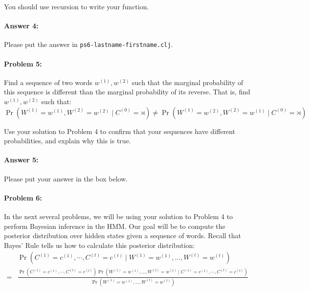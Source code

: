 \documentclass[10pt]{article}
\newenvironment{AnswerBox}{\begin{mdframed}[style=simple]}{\end{mdframed}}
\newcommand{\PSnum}{6}
\begin{document}
You should use recursion to write your function. 

\paragraph{Answer 4:} Please put the answer in
\texttt{ps\PSnum-lastname-firstname.clj}.

\hrulefill%

\paragraph{Problem 5:}
Find a sequence of two words $w^{(1)},w^{(2)}$ such that the marginal
probability of this sequence is different than the marginal
probability of its reverse. That is, find $w^{(1)},w^{(2)}$ such that:
\begin{equation*}
  \Pr(W^{(1)}=w^{(1)}, W^{(2)} =w^{(2)} \mid C^{(0)}=\rtimes )
  \neq \Pr(W^{(1)}=w^{(2)}, W^{(2)} =w^{(1)} \mid C^{(0)}=\rtimes )
\end{equation*}

Use your solution to Problem 4 to confirm that your sequences have
different probabilities, and explain why this is true.

\paragraph{Answer 5:} Please put your answer in the box below.

\begin{AnswerBox}%


\end{AnswerBox}%

\hrulefill%

\paragraph{Problem 6:}

In the next several problems, we will be using your solution to
Problem 4 to perform Bayesian inference in the HMM. Our goal will be
to compute the posterior distribution over hidden states given a
sequence of words. Recall that Bayes' Rule tells us how to calculate
this posterior distribution:
\begin{align*}
&\Pr(C^{(1)}=c^{(1)},\cdots,C^{(t)}=c^{(t)} \mid W^{(1)}=w^{(1)},\dots,W^{(t)}=w^{(t)} )\\
=&\frac{\Pr(C^{(1)}=c^{(1)},\cdots,C^{(t)}=c^{(t)})
        \Pr( W^{(1)}=w^{(1)},\dots,W^{(t)}=w^{(t)} 
        \mid C^{(1)}=c^{(1)},\cdots,C^{(t)}=c^{(t)})}
       {\Pr(W^{(1)}=w^{(1)},\dots,W^{(t)}=w^{(t)})}
\end{align*}
\end{document}
